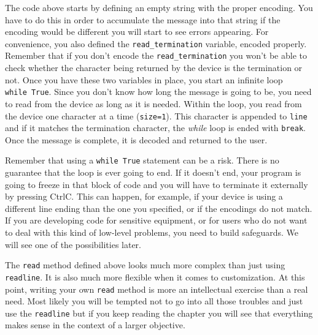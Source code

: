 The code above starts by defining an empty string with the proper
encoding. You have to do this in order to accumulate the message into
that string if the encoding would be different you will start to see
errors appearing. For convenience, you also defined the
\texttt{read\_termination} variable, encoded properly. Remember that if
you don't encode the \texttt{read\_termination} you won't be able to
check whether the character being returned by the device is the
termination or not. Once you have these two variables in place, you
start an infinite loop \texttt{while\ True}. Since you don't know how
long the message is going to be, you need to read from the device as
long as it is needed. Within the loop, you read from the device one
character at a time (\texttt{size=1}). This character is appended to
\texttt{line} and if it matches the termination character, the
\emph{while} loop is ended with \texttt{break}. Once the message is
complete, it is decoded and returned to the user.

Remember that using a \texttt{while\ True} statement can be a risk.
There is no guarantee that the loop is ever going to end. If it doesn't
end, your program is going to freeze in that block of code and you will
have to terminate it externally by pressing CtrlC. This can happen, for
example, if your device is using a different line ending than the one
you specified, or if the encodings do not match. If you are developing
code for sensitive equipment, or for users who do not want to deal with
this kind of low-level problems, you need to build safeguards. We will
see one of the possibilities later.

The \texttt{read} method defined above looks much more complex than just
using \texttt{readline}. It is also much more flexible when it comes to
customization. At this point, writing your own \texttt{read} method is
more an intellectual exercise than a real need. Most likely you will be
tempted not to go into all those troubles and just use the
\texttt{readline} but if you keep reading the chapter you will see that
everything makes sense in the context of a larger objective.



